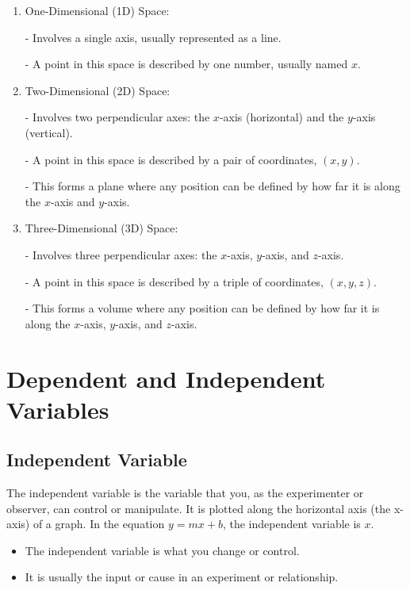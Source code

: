 \documentclass{article}
\begin{document}
\begin{enumerate}
    \item One-Dimensional (1D) Space:

   - Involves a single axis, usually represented as a line.
   
   - A point in this space is described by one number, usually named \( x \).

\item Two-Dimensional (2D) Space:

   - Involves two perpendicular axes: the \( x \)-axis (horizontal) and the \( y \)-axis (vertical).
   
   - A point in this space is described by a pair of coordinates, \( (x, y) \).
   
   - This forms a plane where any position can be defined by how far it is along the \( x \)-axis and \( y \)-axis.

\item Three-Dimensional (3D) Space:

   - Involves three perpendicular axes: the \( x \)-axis, \( y \)-axis, and \( z \)-axis.
   
   - A point in this space is described by a triple of coordinates, \( (x, y, z) \).
   
   - This forms a volume where any position can be defined by how far it is along the \( x \)-axis, \( y \)-axis, and \( z \)-axis.
\end{enumerate}

\section*{Dependent and Independent Variables}

\subsection*{Independent Variable}

The independent variable is the variable that you, as the experimenter or observer, can control or manipulate. It is plotted along the horizontal axis (the x-axis) of a graph. In the equation \( y = mx + b \), the independent variable is \( x \).

\begin{itemize}
    \item The independent variable is what you change or control.
    \item It is usually the input or cause in an experiment or relationship.
\end{itemize}
\end{document}
